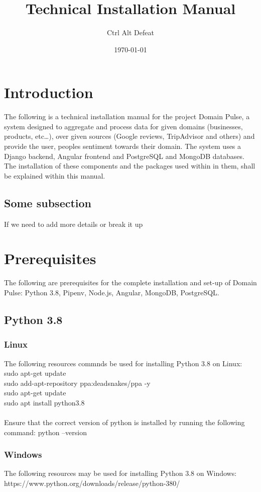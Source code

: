 \documentclass{article}
\title{Technical Installation Manual}
\author{Ctrl Alt Defeat}
\date{\today} %
\begin{document}
\maketitle %


\section{Introduction}
The following is a technical installation manual for the project Domain Pulse, a system designed to aggregate and
process data for given domains (businesses, products, etc…),
over given sources (Google reviews, TripAdvisor and others) and provide the user,
peoples sentiment towards their domain. The system uses a Django backend, Angular frontend and PostgreSQL and MongoDB databases.
The installation of these components and the packages used within in them, shall be explained within this manual.

\subsection{Some subsection}
If we need to add more details or break it up

\section{Prerequisites}
The following are prerequisites for the complete installation and set-up of Domain Pulse: Python 3.8, Pipenv, Node.js, Angular, MongoDB, PostgreSQL.

\subsection{Python 3.8}
\subsubsection{Linux}
The following resources commnds be used for installing Python 3.8 on Linux:\\
sudo apt-get update\\
sudo add-apt-repository ppa:deadsnakes/ppa -y\\
sudo apt-get update\\
sudo apt install python3.8\\ \\
Ensure that the correct version of python is installed by running the following command:
python --version

\subsubsection{Windows}
The following resources may be used for installing Python 3.8 on Windows:
https://www.python.org/downloads/release/python-380/
\end{document}
